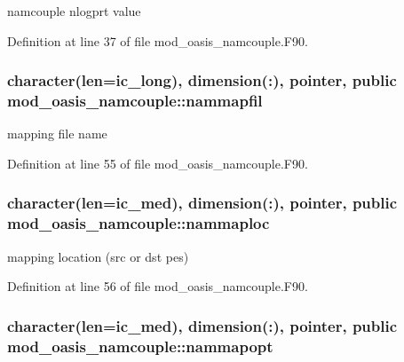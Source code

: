 namcouple nlogprt value 



Definition at line 37 of file mod\+\_\+oasis\+\_\+namcouple.\+F90.

\hypertarget{classmod__oasis__namcouple_a9fc6ac674a8cfa68d9d15ad13213e21d}{
\subsubsection[{nammapfil}]{\setlength{\rightskip}{0pt plus 5cm}character(len=ic\+\_\+long), dimension(\+:), pointer, public mod\+\_\+oasis\+\_\+namcouple\+::nammapfil}}\label{classmod__oasis__namcouple_a9fc6ac674a8cfa68d9d15ad13213e21d}


mapping file name 



Definition at line 55 of file mod\+\_\+oasis\+\_\+namcouple.\+F90.

\hypertarget{classmod__oasis__namcouple_a7316d7d322da7cf10f315e38c145ebbb}{
\subsubsection[{nammaploc}]{\setlength{\rightskip}{0pt plus 5cm}character(len=ic\+\_\+med), dimension(\+:), pointer, public mod\+\_\+oasis\+\_\+namcouple\+::nammaploc}}\label{classmod__oasis__namcouple_a7316d7d322da7cf10f315e38c145ebbb}


mapping location (src or dst pes) 



Definition at line 56 of file mod\+\_\+oasis\+\_\+namcouple.\+F90.

\hypertarget{classmod__oasis__namcouple_ad2554b4881fa63780dd5e6fe78d705ef}{
\subsubsection[{nammapopt}]{\setlength{\rightskip}{0pt plus 5cm}character(len=ic\+\_\+med), dimension(\+:), pointer, public mod\+\_\+oasis\+\_\+namcouple\+::nammapopt}}\label{classmod__oasis__namcouple_ad2554b4881fa63780dd5e6fe78d705ef}


